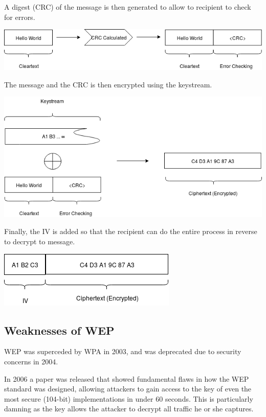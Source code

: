 \documentclass[11pt]{article}
\begin{document}
A digest (CRC) of the message is then generated to allow to recipient to check for errors.

\vspace{10px}
\centerline{\includegraphics[width=\linewidth]{res/crc.png}}

\newpage
The message and the CRC is then encrypted using the keystream.

\vspace{10px}
\centerline{\includegraphics[width=\linewidth]{res/encryption.png}}
\vspace{6px}

Finally, the IV is added so that the recipient can do the entire process in reverse to decrypt to message.

\vspace{10px}
\centerline{\includegraphics[scale=1.0]{res/header.png}}
\vspace{6px}

\subsection{Weaknesses of WEP}
WEP was superceded by WPA in 2003, and was deprecated due to security concerns in 2004. 

In 2006 a paper was released that showed fundamental flaws in how the WEP standard was designed, allowing attackers to gain access to the key of even the most secure (104-bit) implementations in under 60 seconds\citep{breakingWEP60seconds}. This is particularly damning as the key allows the attacker to decrypt all traffic he or she captures.
\end{document}
